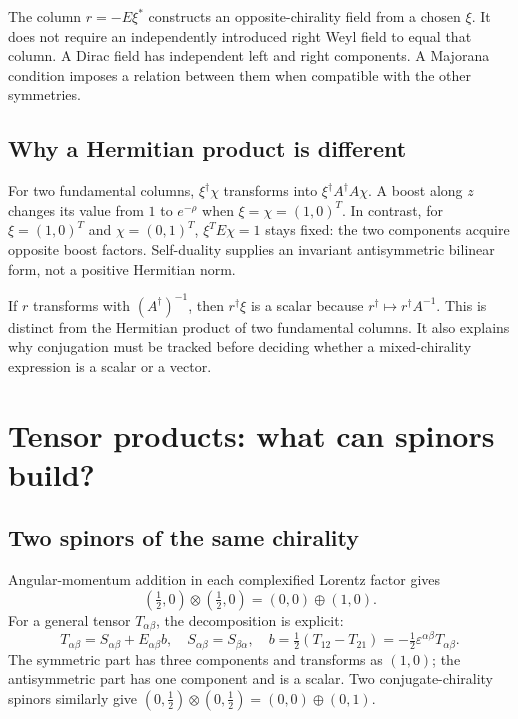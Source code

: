\documentclass[11pt]{article}
\newcommand{\eps}{\varepsilon}
\begin{document}
\begin{warningbox}
The column \(r=-E\xi^*\) constructs an opposite-chirality field from
a chosen \(\xi\). It does not require an independently introduced
right Weyl field to equal that column. A Dirac field has independent
left and right components. A Majorana condition imposes a relation
between them when compatible with the other symmetries.
\end{warningbox}

\subsection{Why a Hermitian product is different}
For two fundamental columns, \(\xi^\dagger\chi\) transforms into
\(\xi^\dagger A^\dagger A\chi\). A boost along \(z\) changes its value
from \(1\) to \(e^{-\rho}\) when \(\xi=\chi=(1,0)^T\).
In contrast, for \(\xi=(1,0)^T\) and \(\chi=(0,1)^T\),
\(\xi^T E\chi=1\) stays fixed: the two components acquire opposite
boost factors. Self-duality supplies an invariant antisymmetric
bilinear form, not a positive Hermitian norm.

If \(r\) transforms with \((A^\dagger)^{-1}\), then \(r^\dagger\xi\)
is a scalar because \(r^\dagger\mapsto r^\dagger A^{-1}\).
This is distinct from the Hermitian product of two fundamental columns.
It also explains why conjugation must be tracked before deciding whether
a mixed-chirality expression is a scalar or a vector.

\section{Tensor products: what can spinors build?}
\subsection{Two spinors of the same chirality}
Angular-momentum addition in each complexified Lorentz factor gives
\begin{equation}
 (\tfrac12,0)\otimes(\tfrac12,0)=(0,0)\oplus(1,0).
 \label{eq:samespin}
\end{equation}
For a general tensor \(T_{\alpha\beta}\), the decomposition is explicit:
\begin{equation}
 T_{\alpha\beta}=S_{\alpha\beta}+E_{\alpha\beta}b,
 \quad S_{\alpha\beta}=S_{\beta\alpha},\quad
 b=\tfrac12(T_{12}-T_{21})
   =-\tfrac12\eps^{\alpha\beta}T_{\alpha\beta}.
 \label{eq:decomp}
\end{equation}
The symmetric part has three components and transforms as \((1,0)\);
the antisymmetric part has one component and is a scalar.
Two conjugate-chirality spinors similarly give
\((0,\tfrac12)\otimes(0,\tfrac12)=(0,0)\oplus(0,1)\).
\end{document}
